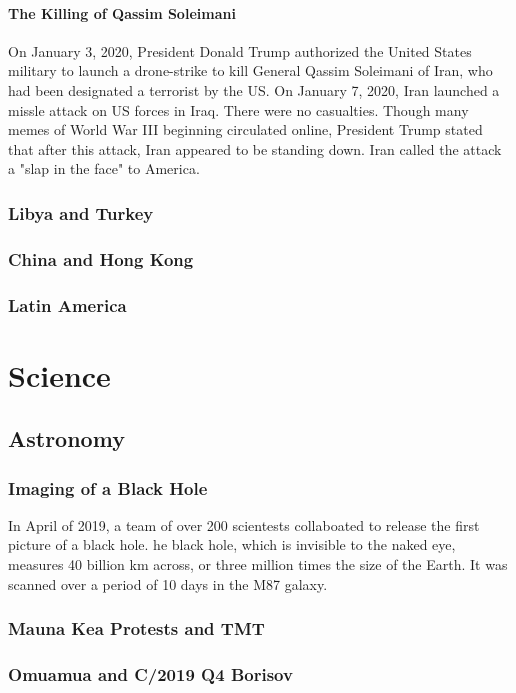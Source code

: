 				\paragraph{The Killing of Qassim Soleimani}
				On January 3, 2020, President Donald Trump authorized the United States military to launch a drone-strike to kill General Qassim Soleimani of Iran, who had been designated a terrorist by the US.  On January 7, 2020, Iran launched a missle attack on US forces in Iraq.  There were no casualties.  Though many memes of World War III beginning circulated online, President Trump stated that after this attack, Iran appeared to be standing down.  Iran called the attack a "slap in the face" to America.  
			\subsubsection{Libya and Turkey}
			\subsubsection{China and Hong Kong}
			\subsubsection{Latin America}
	\section{Science}
		\subsection{Astronomy}
			\subsubsection{Imaging of a Black Hole}
			In April of 2019, a team of over 200 scientests collaboated to release the first picture of a black hole.  he black hole, which is invisible to the naked eye, measures 40 billion km across, or three million times the size of the Earth.  It was scanned over a period of 10 days in the M87 galaxy.  
			
			\subsubsection{Mauna Kea Protests and TMT}
			
			
			\subsubsection{Omuamua and C/2019 Q4 Borisov}
			
